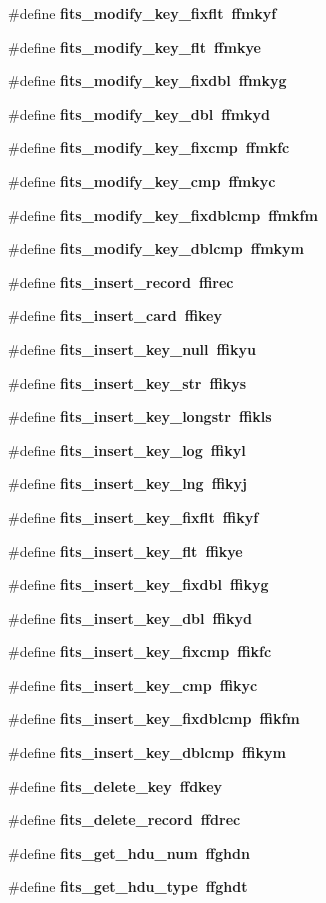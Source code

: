 \begin{CompactItemize}
\item 
\#define \bf{fits\_\-modify\_\-key\_\-fixflt}~ffmkyf
\item 
\#define \bf{fits\_\-modify\_\-key\_\-flt}~ffmkye
\item 
\#define \bf{fits\_\-modify\_\-key\_\-fixdbl}~ffmkyg
\item 
\#define \bf{fits\_\-modify\_\-key\_\-dbl}~ffmkyd
\item 
\#define \bf{fits\_\-modify\_\-key\_\-fixcmp}~ffmkfc
\item 
\#define \bf{fits\_\-modify\_\-key\_\-cmp}~ffmkyc
\item 
\#define \bf{fits\_\-modify\_\-key\_\-fixdblcmp}~ffmkfm
\item 
\#define \bf{fits\_\-modify\_\-key\_\-dblcmp}~ffmkym
\item 
\#define \bf{fits\_\-insert\_\-record}~ffirec
\item 
\#define \bf{fits\_\-insert\_\-card}~ffikey
\item 
\#define \bf{fits\_\-insert\_\-key\_\-null}~ffikyu
\item 
\#define \bf{fits\_\-insert\_\-key\_\-str}~ffikys
\item 
\#define \bf{fits\_\-insert\_\-key\_\-longstr}~ffikls
\item 
\#define \bf{fits\_\-insert\_\-key\_\-log}~ffikyl
\item 
\#define \bf{fits\_\-insert\_\-key\_\-lng}~ffikyj
\item 
\#define \bf{fits\_\-insert\_\-key\_\-fixflt}~ffikyf
\item 
\#define \bf{fits\_\-insert\_\-key\_\-flt}~ffikye
\item 
\#define \bf{fits\_\-insert\_\-key\_\-fixdbl}~ffikyg
\item 
\#define \bf{fits\_\-insert\_\-key\_\-dbl}~ffikyd
\item 
\#define \bf{fits\_\-insert\_\-key\_\-fixcmp}~ffikfc
\item 
\#define \bf{fits\_\-insert\_\-key\_\-cmp}~ffikyc
\item 
\#define \bf{fits\_\-insert\_\-key\_\-fixdblcmp}~ffikfm
\item 
\#define \bf{fits\_\-insert\_\-key\_\-dblcmp}~ffikym
\item 
\#define \bf{fits\_\-delete\_\-key}~ffdkey
\item 
\#define \bf{fits\_\-delete\_\-record}~ffdrec
\item 
\#define \bf{fits\_\-get\_\-hdu\_\-num}~ffghdn
\item 
\#define \bf{fits\_\-get\_\-hdu\_\-type}~ffghdt

\end{CompactItemize}
